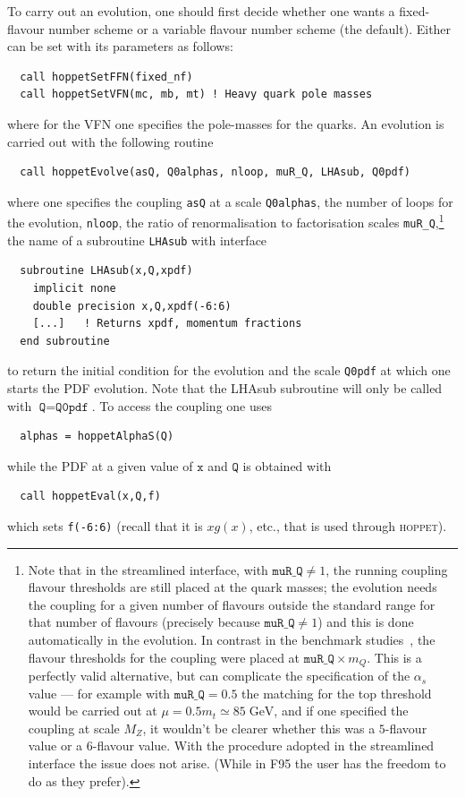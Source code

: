 \documentclass[12pt]{article}
\newcommand{\GeV}{\;\mathrm{GeV}}
\newcommand{\as}{\alpha_s}
\newcommand{\hoppet}{\textsc{hoppet}\xspace}
\newcommand{\ttt}[1]{\texttt{#1}}
\begin{document}
To carry out an evolution, one should first decide whether one wants a
fixed-flavour number scheme or a variable flavour number scheme (the
default). Either can be set with its parameters as follows:
\begin{lstlisting}
  call hoppetSetFFN(fixed_nf)
  call hoppetSetVFN(mc, mb, mt) ! Heavy quark pole masses
\end{lstlisting}
where for the VFN one specifies the pole-masses for the quarks. An
evolution is carried out with the following routine
\begin{lstlisting}
  call hoppetEvolve(asQ, Q0alphas, nloop, muR_Q, LHAsub, Q0pdf)
\end{lstlisting}
where one specifies the coupling \ttt{asQ} at a scale \ttt{Q0alphas},
the number of loops for the evolution, \ttt{nloop}, the ratio of
renormalisation to factorisation scales \ttt{muR\_Q},\footnote{Note
  that in the streamlined interface, with $\ttt{muR\_Q}\ne 1$, the running
  coupling flavour thresholds are still placed at the quark masses;
  the evolution needs the coupling for a given number of flavours
  outside the standard range for that number of flavours (precisely
  because $\ttt{muR\_Q}\ne 1$) and this is done automatically in the
  evolution. In contrast in the benchmark studies~\cite{Benchmarks},
  the flavour thresholds for the coupling were placed at $\ttt{muR\_Q}
  \times m_Q$.  This is a perfectly valid alternative, but can
  complicate the specification of the $\as$ value --- for example with
  $\ttt{muR\_Q} = 0.5$ the matching for the top threshold would be
  carried out at $\mu = 0.5 m_t \simeq 85 \GeV$, and if one specified
  the coupling at scale $M_Z$, it wouldn't be clearer whether this was
  a $5$-flavour value or a $6$-flavour value. With the procedure
  adopted in the streamlined interface the issue does not arise. (While in
  F95 the user has the freedom to do as they prefer). } %
the name of a subroutine \ttt{LHAsub} with interface
\begin{lstlisting}
  subroutine LHAsub(x,Q,xpdf)
    implicit none
    double precision x,Q,xpdf(-6:6)
    [...]   ! Returns xpdf, momentum fractions
  end subroutine 
\end{lstlisting}
to return the initial condition for the evolution and the scale
\ttt{Q0pdf} at which one starts the PDF evolution. Note that the
LHAsub subroutine will only be called with $\ttt{Q}=\ttt{Q0pdf}$.
To access the coupling one uses
\begin{lstlisting}
  alphas = hoppetAlphaS(Q)
\end{lstlisting}
while the PDF at a given value of $\ttt{x}$ and $\ttt{Q}$ is obtained with 
\begin{lstlisting}
  call hoppetEval(x,Q,f)
\end{lstlisting}
which sets \ttt{f(-6:6)} (recall that it is $xg(x)$, etc., that is
used through \hoppet).
\end{document}
